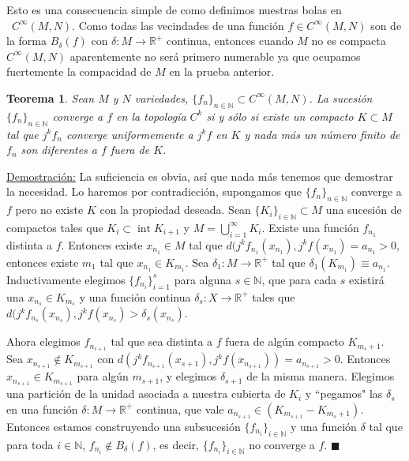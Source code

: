 \documentclass{report}
\newtheorem{theorem}{Teorema}[section]
\theoremstyle{definition}
\DeclareMathOperator{\inte}{int}
\begin{document}
Esto es una consecuencia simple de como definimos nuestras bolas en \\\ $C^\infty (M,N)$. Como todas las vecindades de una funci\'on $f \in C^\infty (M,N)$ son de la forma $B_\delta (f)$ con $\delta : M \to \mathbb{R}^+$ continua, entonces cuando $M$ no es compacta $C^\infty(M,N)$ aparentemente no ser\'a primero numerable ya que ocupamos fuertemente la compacidad de $M$ en la prueba anterior.
\begin{theorem}
Sean $M$ y $N$ variedades, $\{ f_n \}_{n \in \mathbb{N}} \subset C^\infty (M,N)$. La sucesi\'on $ \{ f_n \}_{n \in \mathbb{N}}$ converge a $f$ en la topolog\'ia $C^k$ si y s\'olo si existe  un compacto $K \subset M$ tal que $j^k f_n$ converge uniformemente a $j^k f$ en $K$ y nada m\'as un n\'umero finito de $f_n$ son diferentes a $f$ fuera de $K$.
\end{theorem}
 
\underline{Demostraci\'on:} La suficiencia es obvia, as\'i que nada m\'as tenemos que demostrar la necesidad. Lo haremos por contradicci\'on, supongamos que $\{ f_n \}_{n \in \mathbb{N}}$ converge a $f$ pero no existe $K$ con la propiedad deseada. Sean $ \{ K_i \}_{i \in \mathbb{N}} \subset M$ una sucesi\'on de compactos tales que $K_i \subset \inte K_{i+1}$ y $M = \bigcup\limits_{i=1}^\infty K_i$. Existe una funci\'on $f_{n_1}$ distinta a $f$. Entonces existe $x_{n_1} \in M$ tal que $d(j^k f_{n_1} (x_{n_1}) , j^k f (x_{n_1}) = a_{n_1} >0$, entonces existe $m_1$ tal que $x_{n_1} \in K_{m_1}$. Sea $\delta_1: M \to \mathbb{R}^+$ tal que $\delta_1 (K_{m_1}) \equiv a_{n_1}$. Inductivamente elegimos $ \{ f_{n_i} \}_{i=1}^s$ para alguna $s \in \mathbb{N}$, que para cada $s$ existir\'a una $x_{n_s} \in K_{m_s}$ y una funci\'on continua $\delta_s: X \to \mathbb{R}^+$ tales que $d(j^k f_{n_s} (x_{n_s}) , j^k f (x_{n_s}) > \delta_s (x_{n_s})$.

Ahora elegimos $f_{n_{s+1}}$ tal que sea distinta a $f$ fuera de alg\'un compacto $K_{m_s+1}$. Sea $x_{n_{s+1}} \notin K_{m_{s+1}}$ con $d(j^k f_{n_{s+1}} (x_{s+1} ) , j^k f(x_{n_{s+1}})) = a_{n_{s+1}} >0$. Entonces $x_{n_{s+1}} \in K_{m_{s+1}}$ para alg\'un $m_{s+1}$, y elegimos $\delta_{s+1}$ de la misma manera. Elegimos una partici\'on de la unidad asociada a nuestra cubierta de $K_i$ y ``pegamos" las $\delta_s$ en una funci\'on $\delta: M \to \mathbb{R}^+$ continua, que vale $a_{n_{s+1}} \in (K_{m_{s+1}} - K_{m_s +1} )$. Entonces estamos construyendo una subsucesi\'on $\{ f_{n_i} \}_{i \in \mathbb{N}}$ y una funci\'on $\delta$ tal que para toda $i \in \mathbb{N}$, $f_{n_i} \notin B_\delta (f)$, es decir, $ \{ f_{n_i} \}_{i \in \mathbb{N}}$ no converge a $f$. $\blacksquare$
\end{document}

